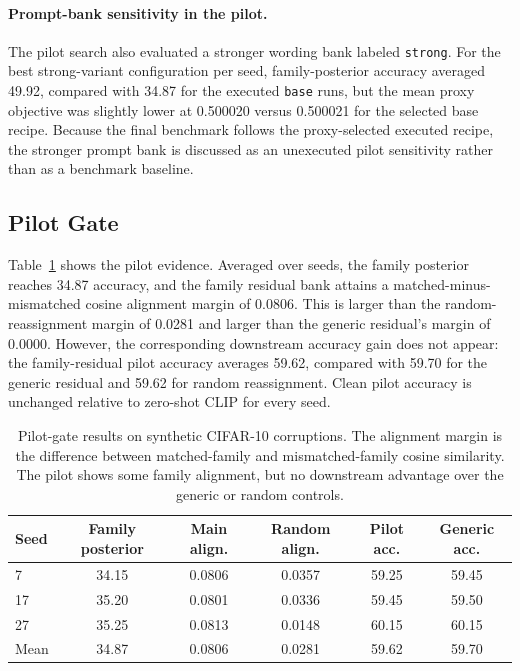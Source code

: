 \documentclass{article}
\begin{document}
\paragraph{Prompt-bank sensitivity in the pilot.}
The pilot search also evaluated a stronger wording bank labeled \texttt{strong}. For the best strong-variant configuration per seed, family-posterior accuracy averaged 49.92, compared with 34.87 for the executed \texttt{base} runs, but the mean proxy objective was slightly lower at 0.500020 versus 0.500021 for the selected base recipe. Because the final benchmark follows the proxy-selected executed recipe, the stronger prompt bank is discussed as an unexecuted pilot sensitivity rather than as a benchmark baseline.

\subsection{Pilot Gate}

Table~\ref{tab:pilot} shows the pilot evidence. Averaged over seeds, the family posterior reaches 34.87 accuracy, and the family residual bank attains a matched-minus-mismatched cosine alignment margin of 0.0806. This is larger than the random-reassignment margin of 0.0281 and larger than the generic residual's margin of 0.0000. However, the corresponding downstream accuracy gain does not appear: the family-residual pilot accuracy averages 59.62, compared with 59.70 for the generic residual and 59.62 for random reassignment. Clean pilot accuracy is unchanged relative to zero-shot CLIP for every seed.

\begin{table}[t]
\caption{Pilot-gate results on synthetic CIFAR-10 corruptions. The alignment margin is the difference between matched-family and mismatched-family cosine similarity. The pilot shows some family alignment, but no downstream advantage over the generic or random controls.}
\label{tab:pilot}
\centering
\small
\begin{tabular}{lccccc}
\toprule
Seed & Family posterior & Main align. & Random align. & Pilot acc. & Generic acc. \\
\midrule
7 & 34.15 & 0.0806 & 0.0357 & 59.25 & 59.45 \\
17 & 35.20 & 0.0801 & 0.0336 & 59.45 & 59.50 \\
27 & 35.25 & 0.0813 & 0.0148 & 60.15 & 60.15 \\
\midrule
Mean & 34.87 & 0.0806 & 0.0281 & 59.62 & 59.70 \\
\bottomrule
\end{tabular}
\end{table}
\end{document}
